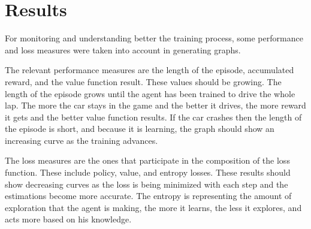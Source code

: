 \chapter{Results}
For monitoring and understanding better the training process, some performance and loss measures were taken into account in generating graphs. 

The relevant performance measures are the length of the episode, accumulated reward, and the value function result. These values should be growing. The length of the episode grows until the agent has been trained to drive the whole lap. The more the car stays in the game and the better it drives, the more reward it gets and the better value function results. If the car crashes then the length of the episode is short, and because it is learning, the graph should show an increasing curve as the training advances. 

The loss measures are the ones that participate in the composition of the loss function. These include policy, value, and entropy losses. These results should show decreasing curves as the loss is being minimized with each step and the estimations become more accurate. The entropy is representing the amount of exploration that the agent is making, the more it learns, the less it explores, and acts more based on his knowledge.

